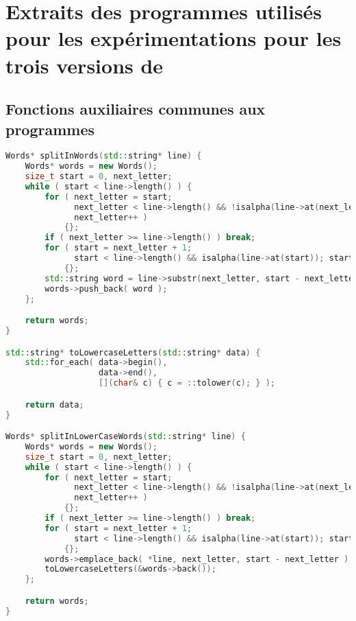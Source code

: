 \chapter{Extraits des programmes utilisés pour les expérimentations pour les trois versions de }
\label{appendice-code-wordcount-sf.ann}

\section{Fonctions auxiliaires communes aux programmes}

\begin{lstlisting}[basicstyle=\ttfamily\footnotesize,language=c++]
Words* splitInWords(std::string* line) {
    Words* words = new Words();
    size_t start = 0, next_letter;
    while ( start < line->length() ) {
        for ( next_letter = start;
              next_letter < line->length() && !isalpha(line->at(next_letter));
              next_letter++ )
            {};
        if ( next_letter >= line->length() ) break;
        for ( start = next_letter + 1;
              start < line->length() && isalpha(line->at(start)); start++ )
            {};
        std::string word = line->substr(next_letter, start - next_letter); 
        words->push_back( word );
    };

    return words;
}

std::string* toLowercaseLetters(std::string* data) {
    std::for_each( data->begin(),
                   data->end(),
                   [](char& c) { c = ::tolower(c); } );

    return data;
}

Words* splitInLowerCaseWords(std::string* line) {
    Words* words = new Words();
    size_t start = 0, next_letter;
    while ( start < line->length() ) {
        for ( next_letter = start;
              next_letter < line->length() && !isalpha(line->at(next_letter));
              next_letter++ )
            {};
        if ( next_letter >= line->length() ) break;
        for ( start = next_letter + 1;
              start < line->length() && isalpha(line->at(start)); start++ )
            {};
        words->emplace_back( *line, next_letter, start - next_letter );
        toLowercaseLetters(&words->back());
    };

    return words;
}
\end{lstlisting}


